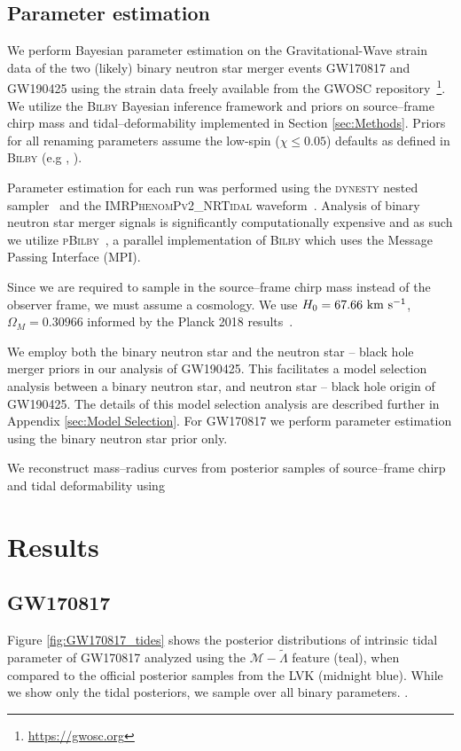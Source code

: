 \documentclass[twocolumn]{aastex631}
\begin{document}
\subsection{Parameter estimation}
We perform Bayesian parameter estimation on the Gravitational-Wave strain data of the two (likely) binary neutron star merger events GW170817 and GW190425 using the strain data freely available from the GWOSC repository~\footnote{\url{https://gwosc.org}}. 
We utilize the \textsc{Bilby} Bayesian inference framework and priors on source--frame chirp mass and tidal--deformability implemented in Section \ref{sec:Methods}. Priors for all renaming parameters assume the low-spin ($\chi \leq 0.05$) defaults as defined in \textsc{Bilby} (e.g \citealt{ashton19}, \citealt{romeroshaw20}).

Parameter estimation for each run was performed using the \textsc{dynesty} nested sampler~\citep{Dynesty} and the \textsc{IMRPhenomPv2\_NRTidal} waveform~\citep{IMRPhenomP_NRtidal}. Analysis of binary neutron star merger signals is significantly computationally expensive and as such we utilize \textsc{pBilby}~\citep{pbilby}, a parallel implementation of \textsc{Bilby} which uses the Message Passing Interface (MPI). 

Since we are required to sample in the source--frame chirp mass instead of the observer frame, we must assume a cosmology. We use $H_0=67.66 \rm  \ km  \ s^{-1}$, $\Omega_M = 0.30966 $ informed by the Planck 2018 results~\citep{Planck}.  

We employ both the binary neutron star and the neutron star -- black hole merger priors in our analysis of GW190425. This facilitates a model selection analysis between a binary neutron star, and neutron star -- black hole origin of GW190425. The details of this model selection analysis are described further in Appendix \ref{sec:Model Selection}. 
For GW170817 we perform parameter estimation using the binary neutron star prior only. 

We reconstruct mass--radius curves from posterior samples of source--frame chirp and tidal deformability using \red{\ldots}


\section{Results} \label{sec:Results}
 

\subsection{GW170817}
Figure \ref{fig:GW170817_tides} shows the posterior distributions of intrinsic tidal parameter of GW170817 analyzed using the $\mathcal{M}-\tilde{\Lambda}$ feature (teal), when compared to the official posterior samples from the LVK (midnight blue). While we show only the tidal posteriors, we sample over all binary parameters. . 
\end{document}

